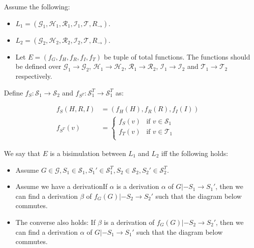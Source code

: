 \begin{definition}
  Assume the following:
  \begin{itemize}
  \item
    $L_1 = (\mathcal{G}_1, \mathcal{H}_1, \mathcal{R}_1, \mathcal{I}_1,
    \mathcal{T}, R_\to)$.
  \item
    $L_2 = (\mathcal{G}_2, \mathcal{H}_2, \mathcal{R}_2, \mathcal{I}_2,
    \mathcal{T}, R_\to)$.
  \item Let $E = (f_G, f_H, f_R, f_I, f_T)$ be tuple of total functions. The
    functions should be defined over $\mathcal{G}_1 \to \mathcal{G}_2$,
    $\mathcal{H}_1 \to \mathcal{H}_2$, $\mathcal{R}_1 \to \mathcal{R}_2$,
    $\mathcal{I}_1 \to \mathcal{I}_2$ and $\mathcal{T}_1 \to \mathcal{T}_2$
    respectively.
  \end{itemize}

  Define $f_S : \mathcal{S}_1 \to \mathcal{S}_2$ and
  $f_{S^T} : \mathcal{S}_1^T \to \mathcal{S}_1^T$ as:

  \begin{align*}
    f_S(H, R, I) &= (f_H(H), f_R(R), f_I(I)) \\
    f_{S^T}(v) &=
                 \begin{cases}
                   f_S(v) & \text{if $v \in \mathcal{S}_1$} \\
                   f_T(v) & \text{if $v \in \mathcal{T}_1$} \\
                 \end{cases}
  \end{align*}

  We say that $E$ is a bisimulation between $L_1$ and $L_2$ iff the following
  holds:

  \begin{itemize}
  \item Assume
    $G \in \mathcal{G}, S_1 \in \mathcal{S}_1, S_1' \in \mathcal{S}_1^T, S_2 \in
    \mathcal{S}_2, S_2' \in \mathcal{S}_2^T$.
  \item Assume we have a derivationIf $\alpha$ is a derivation $\alpha$ of $G |- S_1 \to S_1'$, then we can
    find a derivation $\beta$ of $f_G(G) |- S_2 \to S_2'$ such that the diagram
    below commutes.
  \item The converse also holds: If $\beta$ is a derivation of
    $f_G(G) |- S_2 \to S_2'$, then we can find a derivation $\alpha$ of
    $G |- S_1 \to S_1'$ such that the diagram below commutes.
  \end{itemize}
\end{definition}

